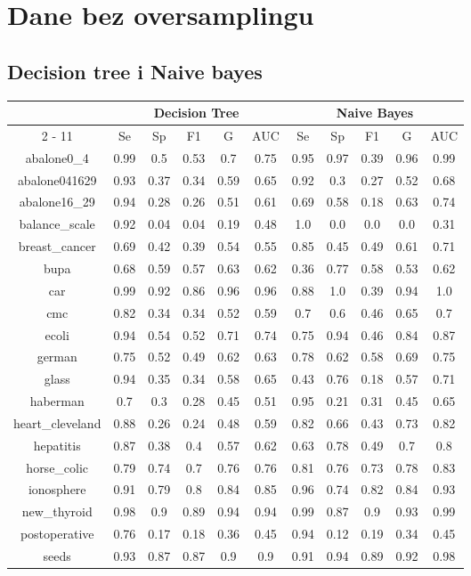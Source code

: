 \documentclass{article}%
\begin{document}
%
\normalsize%
\section*{Dane bez oversamplingu}%
\subsection*{Decision tree i Naive bayes}%
\begin{tabular}{|c|c|c|c|c|c|c|c|c|c|c|}%
\hline%
&\multicolumn{5}{|c|}{Decision Tree}&\multicolumn{5}{|c|}{Naive Bayes}\\%
\cline{2%
-%
11}%
&Se&Sp&F1&G&AUC&Se&Sp&F1&G&AUC\\%
\hline%
abalone0\_4&0.99&0.5&0.53&0.7&0.75&0.95&0.97&0.39&0.96&0.99\\%
abalone041629&0.93&0.37&0.34&0.59&0.65&0.92&0.3&0.27&0.52&0.68\\%
abalone16\_29&0.94&0.28&0.26&0.51&0.61&0.69&0.58&0.18&0.63&0.74\\%
balance\_scale&0.92&0.04&0.04&0.19&0.48&1.0&0.0&0.0&0.0&0.31\\%
breast\_cancer&0.69&0.42&0.39&0.54&0.55&0.85&0.45&0.49&0.61&0.71\\%
bupa&0.68&0.59&0.57&0.63&0.62&0.36&0.77&0.58&0.53&0.62\\%
car&0.99&0.92&0.86&0.96&0.96&0.88&1.0&0.39&0.94&1.0\\%
cmc&0.82&0.34&0.34&0.52&0.59&0.7&0.6&0.46&0.65&0.7\\%
ecoli&0.94&0.54&0.52&0.71&0.74&0.75&0.94&0.46&0.84&0.87\\%
german&0.75&0.52&0.49&0.62&0.63&0.78&0.62&0.58&0.69&0.75\\%
glass&0.94&0.35&0.34&0.58&0.65&0.43&0.76&0.18&0.57&0.71\\%
haberman&0.7&0.3&0.28&0.45&0.51&0.95&0.21&0.31&0.45&0.65\\%
heart\_cleveland&0.88&0.26&0.24&0.48&0.59&0.82&0.66&0.43&0.73&0.82\\%
hepatitis&0.87&0.38&0.4&0.57&0.62&0.63&0.78&0.49&0.7&0.8\\%
horse\_colic&0.79&0.74&0.7&0.76&0.76&0.81&0.76&0.73&0.78&0.83\\%
ionosphere&0.91&0.79&0.8&0.84&0.85&0.96&0.74&0.82&0.84&0.93\\%
new\_thyroid&0.98&0.9&0.89&0.94&0.94&0.99&0.87&0.9&0.93&0.99\\%
postoperative&0.76&0.17&0.18&0.36&0.45&0.94&0.12&0.19&0.34&0.45\\%
seeds&0.93&0.87&0.87&0.9&0.9&0.91&0.94&0.89&0.92&0.98\\%

\end{tabular}
\end{document}
